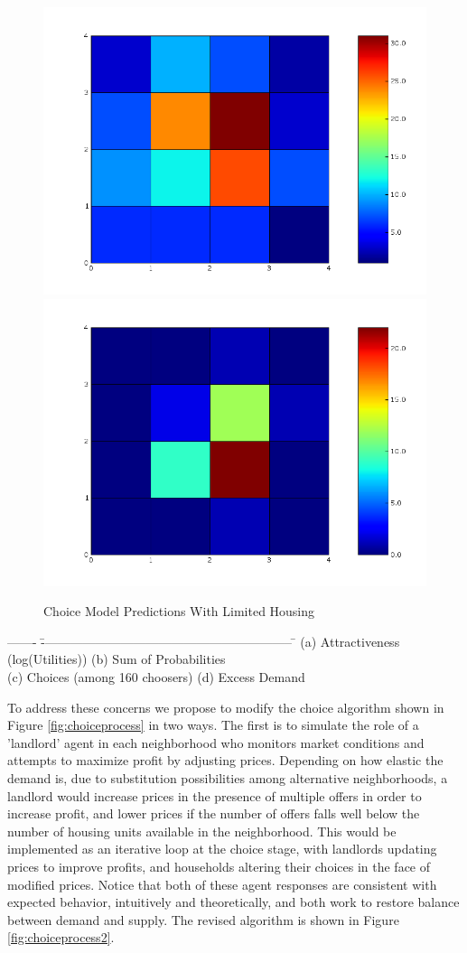 \documentclass[12pt,a4paper]{article}
\begin{document}
\begin{figure}[h]
\centerline{
 \includegraphics[width=.45\textwidth,height=0.35\textwidth]
 {example_grid_count.png} \hspace{1cm}
 \includegraphics[width=.45\textwidth,height=0.35\textwidth]
 {example_grid_excess.png}}
\caption{\label{fig:grid1} Choice Model Predictions With Limited
Housing}
\end{figure}

\begin{tabbing}
------- \= ------------------------------------------------------------ \= \kill
\> (a) Attractiveness (log(Utilities))  \> (b) Sum of
Probabilities \\  \> (c) Choices (among 160 choosers) \> (d)
Excess Demand
\end{tabbing}


To address these concerns we propose to modify the choice
algorithm shown in Figure \ref{fig:choiceprocess} in two ways. The
first is to simulate the role of a 'landlord' agent in each
neighborhood who monitors market conditions and attempts to
maximize profit by adjusting prices. Depending on how elastic the
demand is, due to substitution possibilities among alternative
neighborhoods, a landlord would increase prices in the presence of
multiple offers in order to increase profit, and lower prices if
the number of offers falls well below the number of housing units
available in the neighborhood.  This would be implemented as an
iterative loop at the choice stage, with landlords updating prices
to improve profits, and households altering their choices in the
face of modified prices.  Notice that both of these agent
responses are consistent with expected behavior, intuitively and
theoretically, and both work to restore balance between demand and
supply.  The revised algorithm is shown in Figure
\ref{fig:choiceprocess2}.
\end{document}
